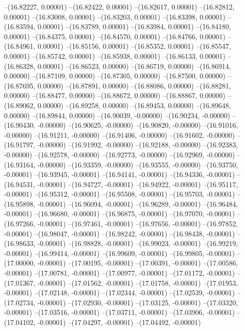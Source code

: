--(16.82227, 0.00001)
--(16.82422, 0.00001)
--(16.82617, 0.00001)
--(16.82812, 0.00001)
--(16.83008, 0.00001)
--(16.83203, 0.00001)
--(16.83398, 0.00001)
--(16.83594, 0.00001)
--(16.83789, 0.00001)
--(16.83984, 0.00001)
--(16.84180, 0.00001)
--(16.84375, 0.00001)
--(16.84570, 0.00001)
--(16.84766, 0.00001)
--(16.84961, 0.00001)
--(16.85156, 0.00001)
--(16.85352, 0.00001)
--(16.85547, 0.00001)
--(16.85742, 0.00001)
--(16.85938, 0.00001)
--(16.86133, 0.00001)
--(16.86328, 0.00001)
--(16.86523, 0.00000)
--(16.86719, 0.00000)
--(16.86914, 0.00000)
--(16.87109, 0.00000)
--(16.87305, 0.00000)
--(16.87500, 0.00000)
--(16.87695, 0.00000)
--(16.87891, 0.00000)
--(16.88086, 0.00000)
--(16.88281, 0.00000)
--(16.88477, 0.00000)
--(16.88672, 0.00000)
--(16.88867, 0.00000)
--(16.89062, 0.00000)
--(16.89258, 0.00000)
--(16.89453, 0.00000)
--(16.89648, 0.00000)
--(16.89844, 0.00000)
--(16.90039, -0.00000)
--(16.90234, -0.00000)
--(16.90430, -0.00000)
--(16.90625, -0.00000)
--(16.90820, -0.00000)
--(16.91016, -0.00000)
--(16.91211, -0.00000)
--(16.91406, -0.00000)
--(16.91602, -0.00000)
--(16.91797, -0.00000)
--(16.91992, -0.00000)
--(16.92188, -0.00000)
--(16.92383, -0.00000)
--(16.92578, -0.00000)
--(16.92773, -0.00000)
--(16.92969, -0.00000)
--(16.93164, -0.00000)
--(16.93359, -0.00000)
--(16.93555, -0.00000)
--(16.93750, -0.00001)
--(16.93945, -0.00001)
--(16.94141, -0.00001)
--(16.94336, -0.00001)
--(16.94531, -0.00001)
--(16.94727, -0.00001)
--(16.94922, -0.00001)
--(16.95117, -0.00001)
--(16.95312, -0.00001)
--(16.95508, -0.00001)
--(16.95703, -0.00001)
--(16.95898, -0.00001)
--(16.96094, -0.00001)
--(16.96289, -0.00001)
--(16.96484, -0.00001)
--(16.96680, -0.00001)
--(16.96875, -0.00001)
--(16.97070, -0.00001)
--(16.97266, -0.00001)
--(16.97461, -0.00001)
--(16.97656, -0.00001)
--(16.97852, -0.00001)
--(16.98047, -0.00001)
--(16.98242, -0.00001)
--(16.98438, -0.00001)
--(16.98633, -0.00001)
--(16.98828, -0.00001)
--(16.99023, -0.00001)
--(16.99219, -0.00001)
--(16.99414, -0.00001)
--(16.99609, -0.00001)
--(16.99805, -0.00001)
--(17.00000, -0.00001)
--(17.00195, -0.00001)
--(17.00391, -0.00001)
--(17.00586, -0.00001)
--(17.00781, -0.00001)
--(17.00977, -0.00001)
--(17.01172, -0.00001)
--(17.01367, -0.00001)
--(17.01562, -0.00001)
--(17.01758, -0.00001)
--(17.01953, -0.00001)
--(17.02148, -0.00001)
--(17.02344, -0.00001)
--(17.02539, -0.00001)
--(17.02734, -0.00001)
--(17.02930, -0.00001)
--(17.03125, -0.00001)
--(17.03320, -0.00001)
--(17.03516, -0.00001)
--(17.03711, -0.00001)
--(17.03906, -0.00001)
--(17.04102, -0.00001)
--(17.04297, -0.00001)
--(17.04492, -0.00001)
